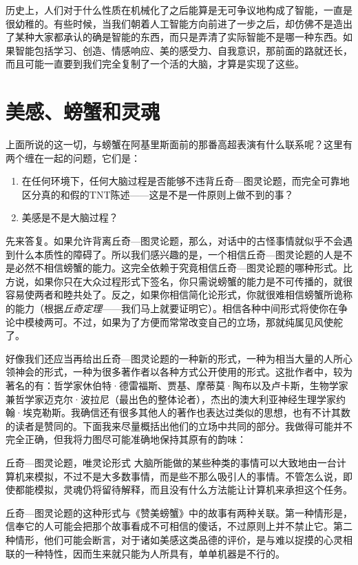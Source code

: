 历史上，人们对于什么性质在机械化了之后能算是无可争议地构成了智能，一直是很幼稚的。有些时候，当我们朝着人工智能方向前进了一步之后，却仿佛不是造出了某种大家都承认的确是智能的东西，而只是弄清了实际智能不是哪一种东西。如果智能包括学习、创造、情感响应、美的感受力、自我意识，那前面的路就还长，而且可能一直要到我们完全复制了一个活的大脑，才算是实现了这些。

\section{美感、螃蟹和灵魂}

上面所说的这一切，与螃蟹在阿基里斯面前的那番高超表演有什么联系呢？这里有两个缠在一起的问题，它们是：
\begin{enumerate}
\item 在任何环境下，任何大脑过程是否能够不违背丘奇—图灵论题，而完全可靠地区分真的和假的TNT陈述——这是不是一件原则上做不到的事？
\item 美感是不是大脑过程？
\end{enumerate}

先来答复。如果允许背离丘奇—图灵论题，那么，对话中的古怪事情就似乎不会遇到什么本质性的障碍了。所以我们感兴趣的是，一个相信丘奇—图灵论题的人是不是必然不相信螃蟹的能力。这完全依赖于究竟相信丘奇—图灵论题的哪种形式。比方说，如果你只在大众过程形式下签名，你只需说螃蟹的能力是不可传播的，就很容易使两者和睦共处了。反之，如果你相信简化论形式，你就很难相信螃蟹所诡称的能力（根据\emph{丘奇定理}——我们马上就要证明它）。相信各种中间形式将使你在争论中模棱两可。不过，如果为了方便而常常改变自己的立场，那就纯属见风使舵了。

好像我们还应当再给出丘奇—图灵论题的一种新的形式，一种为相当大量的人所心领神会的形式，一种为很多著作者以各种方式公开使用的形式。这批作者中，较为著名的有：哲学家休伯特·德雷福斯、贾基、摩蒂莫·陶布以及卢卡斯，生物学家兼哲学家迈克尔·波拉尼（最出色的整体论者），杰出的澳大利亚神经生理学家约翰·埃克勒斯。我确信还有很多其他人的著作也表达过类似的思想，也有不计其数的读者是赞同的。下面我来尽量概括出他们的立场中共同的部分。我做得可能并不完全正确，但我将力图尽可能准确地保持其原有的韵味：

\begin{thm}[2\ccwd]{丘奇—图灵论题，唯灵论形式}
大脑所能做的某些种类的事情可以大致地由一台计算机来模拟，不过不是大多数事情，而是些不那么吸引人的事情。不管怎么说，即使都能模拟，灵魂仍将留待解释，而且没有什么方法能让计算机来承担这个任务。
\end{thm}

丘奇—图灵论题的这种形式与《赞美螃蟹》中的故事有两种关联。第一种情形是，信奉它的人可能会把那个故事看成不可相信的傻话，不过原则上并不禁止它。第二种情形，他们可能会断言，对于诸如美感这类品德的评价，是与难以捉摸的心灵相联的一种特性，因而生来就只能为人所具有，单单机器是不行的。

